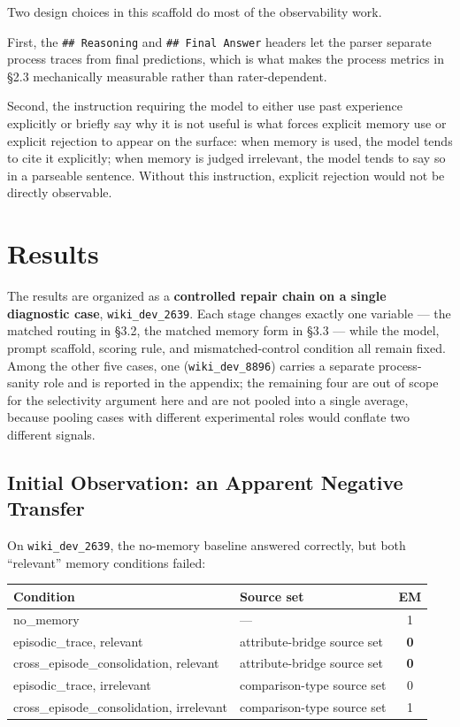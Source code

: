 \documentclass[11pt]{article}
\begin{document}
Two design choices in this scaffold do most of the observability work.

First, the \texttt{\#\# Reasoning} and \texttt{\#\# Final Answer} headers let the parser separate process traces from final predictions, which is what makes the process metrics in \S2.3 mechanically measurable rather than rater-dependent.

Second, the instruction requiring the model to either use past experience explicitly or briefly say why it is not useful is what forces explicit memory use or explicit rejection to appear on the surface: when memory is used, the model tends to cite it explicitly; when memory is judged irrelevant, the model tends to say so in a parseable sentence. Without this instruction, explicit rejection would not be directly observable.

\section{Results}

The results are organized as a \textbf{controlled repair chain on a single diagnostic case}, \texttt{wiki\_dev\_2639}. Each stage changes exactly one variable --- the matched routing in \S3.2, the matched memory form in \S3.3 --- while the model, prompt scaffold, scoring rule, and mismatched-control condition all remain fixed. Among the other five cases, one (\texttt{wiki\_dev\_8896}) carries a separate process-sanity role and is reported in the appendix; the remaining four are out of scope for the selectivity argument here and are not pooled into a single average, because pooling cases with different experimental roles would conflate two different signals.

\subsection{Initial Observation: an Apparent Negative Transfer}

On \texttt{wiki\_dev\_2639}, the no-memory baseline answered correctly, but both ``relevant'' memory conditions failed:

\begin{center}
\begin{tabularx}{\textwidth}{Y Y c}
\toprule
Condition & Source set & EM \\
\midrule
no\_memory & --- & 1 \\
episodic\_trace, relevant & attribute-bridge source set & \textbf{0} \\
cross\_episode\_consolidation, relevant & attribute-bridge source set & \textbf{0} \\
episodic\_trace, irrelevant & comparison-type source set & 0 \\
cross\_episode\_consolidation, irrelevant & comparison-type source set & 1 \\
\bottomrule
\end{tabularx}
\end{center}
\end{document}
